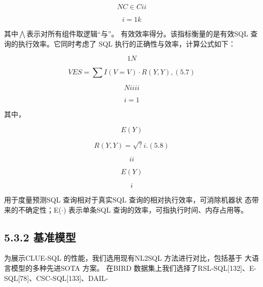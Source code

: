 \documentclass[12pt,a4paper,openright,UTF8]{ctexbook}
\begin{document}
\begin{equation*}
NC\in{C}ii
\end{equation*}

\begin{equation*}
i=1k
\end{equation*}

其中$\bigwedge$表示对所有组件取逻辑“与”。 有效效率得分。该指标衡量的是有效SQL 查询的执行效率。它同时考虑了 SQL 执行的正确性与效率，计算公式如下：

\begin{equation*}
1N
\end{equation*}

\begin{equation*}
VES =\sum I(V= V) \cdot R(Y, Y),(5.7)
\end{equation*}

\begin{equation*}
Niiii
\end{equation*}

\begin{equation*}
i=1
\end{equation*}

其中，

\begin{equation*}
E(Y)
\end{equation*}

\begin{equation*}
R(Y, Y) = \sqrt{?} i.(5.8)
\end{equation*}

\begin{equation*}
ii
\end{equation*}

\begin{equation*}
E(Y)
\end{equation*}

\begin{equation*}
i
\end{equation*}

用于度量预测SQL 查询相对于真实SQL 查询的相对执行效率，可消除机器状 态带来的不确定性；E($\cdot$) 表示单条SQL 查询的效率，可指执行时间、内存占用等。

\subsection{5.3.2 基准模型}

为展示CLUE-SQL 的性能，我们选用现有NL2SQL 方法进行对比，包括基于 大语言模型的多种先进SOTA 方案。 在BIRD 数据集上我们选择了RSL-SQL[132]、E-SQL[78]、CSC-SQL[133]、DAIL-
\end{document}
